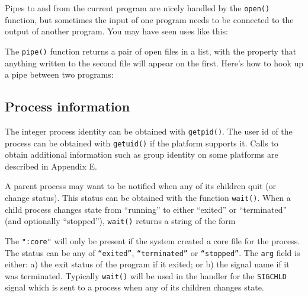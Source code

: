 
Pipes to and from the current program are nicely handled by the
\texttt{open()} function, but sometimes the input of one program needs
to be connected to the output of another program. You may have seen
uses like this:


The \texttt{pipe()} function returns a pair of open files in a list,
with the property that anything written to the second file will appear
on the first. Here's how to hook up a pipe between two
programs:


\subsection{Process information}

The integer process identity can be obtained with
\texttt{getpid()}. The user id of the process can be
obtained with \texttt{getuid()} if the platform
supports it. Calls to obtain additional information such as group
identity on some platforms are described in Appendix E.

A parent process may want to be notified when any of its children quit
(or change status). This status can be obtained with the function
\texttt{wait()}. When a child process changes state from
``running'' to either
``exited'' or
``terminated'' (and optionally
``stopped''), \texttt{wait()} returns a
string of the form


The \texttt{":core"} will only be present if
the system created a core file for the process. The status can be any
of \texttt{``exited''},
\texttt{``terminated''} or
\texttt{``stopped''}. The \texttt{arg} field
is either: a) the exit status of the program if it exited; or b) the
signal name if it was terminated. Typically \texttt{wait()} will be
used in the handler for the \texttt{SIGCHLD} signal which is sent to a
process when any of its children changes state.

